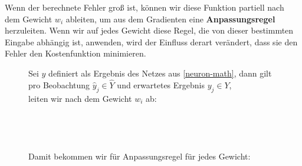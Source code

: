                 \noindent
                Wenn der berechnete Fehler groß ist, können wir diese Funktion partiell nach dem Gewicht $w_i$ ableiten, um aus dem Gradienten eine \textbf{Anpassungsregel} herzuleiten. Wenn wir auf jedes Gewicht diese Regel, die von dieser bestimmten Eingabe abhängig ist, anwenden, wird der Einfluss derart verändert, dass sie den Fehler den Kostenfunktion minimieren.

                \begin{figure}[H]
                    \begin{mdframed}
                        \noindent
                        Sei $\widehat{y}$ definiert als Ergebnis des Netzes aus \ref{neuron-math}, dann gilt \\
                        pro Beobachtung $\widehat{y}_j \in \widehat{Y}$ und erwartetes Ergebnis $y_j \in Y$, \\
                        leiten wir nach dem Gewicht $w_i$ ab:\\[4mm]
    \hspace*{40mm}  \\[2mm]
    \hspace*{62.3mm}  \\[2mm]
    \hspace*{62.3mm}  \\[2mm]
    \hspace*{62.3mm} \\[4mm]
                        Damit bekommen wir für Anpassungsregel für jedes Gewicht:\\[4mm]
                        \hspace*{40mm} 
\end{mdframed}
\end{figure}
